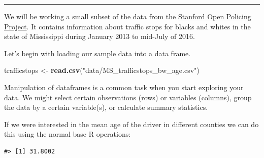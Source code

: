 \documentclass[]{book}
\newenvironment{Shaded}{\begin{snugshade}}{\end{snugshade}}
\newcommand{\DataTypeTok}[1]{\textcolor[rgb]{0.13,0.29,0.53}{#1}}
\newcommand{\KeywordTok}[1]{\textcolor[rgb]{0.13,0.29,0.53}{\textbf{#1}}}
\newcommand{\NormalTok}[1]{#1}
\newcommand{\OperatorTok}[1]{\textcolor[rgb]{0.81,0.36,0.00}{\textbf{#1}}}
\newcommand{\OtherTok}[1]{\textcolor[rgb]{0.56,0.35,0.01}{#1}}
\newcommand{\StringTok}[1]{\textcolor[rgb]{0.31,0.60,0.02}{#1}}
\begin{document}
\begin{center}\rule{0.5\linewidth}{\linethickness}\end{center}

We will be working a small subset of the data from the \href{https://openpolicing.stanford.edu}{Stanford Open Policing Project}. It contains information about traffic stops for blacks and whites in the state of Mississippi during January 2013 to mid-July of 2016.

Let's begin with loading our sample data into a data frame.

\begin{Shaded}
\begin{Highlighting}[]
\NormalTok{trafficstops <-}\StringTok{ }\KeywordTok{read.csv}\NormalTok{(}\StringTok{"data/MS_trafficstops_bw_age.csv"}\NormalTok{)}
\end{Highlighting}
\end{Shaded}

Manipulation of dataframes is a common task when you start exploring your data. We might select certain observations (rows) or variables (columns), group the data by a certain variable(s), or calculate summary statistics.

If we were interested in the mean age of the driver in different counties we can do this using the normal base R operations:

\begin{Shaded}
\end{Shaded}

\begin{verbatim}
#> [1] 31.8002
\end{verbatim}

\begin{Shaded}
\end{Shaded}
\end{document}
